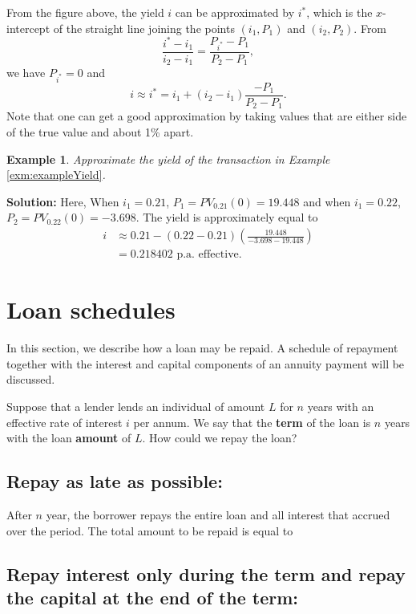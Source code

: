 \documentclass[
]{book}
\theoremstyle{definition}
\theoremstyle{definition}
\newtheorem{example}{Example}[chapter]
\theoremstyle{definition}
\theoremstyle{definition}
\theoremstyle{remark}
\begin{document}
From the figure above, the yield \(i\) can be approximated by \(i^*\), which
is the \(x\)-intercept of the straight line joining the points \((i_1,P_1)\)
and \((i_2,P_2)\). From
\[\frac{i^* -i_1}{i_2 - i_1} = \frac{P_{i^*} - P_1}{P_2 - P_1},\] we
have \(P_{i^*} = 0\) and
\[i \approx i^* =  i_1 + (i_2 - i_1) \frac{ - P_1}{P_2 - P_1}.\] Note
that one can get a good approximation by taking values that are either
side of the true value and about 1\% apart.

\begin{example}
\emph{Approximate the yield of the transaction in Example}
\ref{exm:exampleYield}\emph{.}
\end{example}

\textbf{Solution:} Here, When \(i_1 = 0.21\), \(P_1 = PV_{0.21}(0) = 19.448\) and
when \(i_1 = 0.22\), \(P_2 = PV_{0.22}(0) = -3.698.\) The yield is
approximately equal to \[\begin{aligned}
 i &\approx 0.21 - (0.22 - 0.21) \left(  \frac{19.448}{-3.698 - 19.448} \right) \\
   &= 0.218402 \text{ p.a. effective.}\end{aligned}\]

\section{Loan schedules}\label{loan-schedules}

In this section, we describe how a loan may be repaid. A schedule of
repayment together with the interest and capital components of an
annuity payment will be discussed.

Suppose that a lender lends an individual of amount \(L\) for \(n\) years
with an effective rate of interest \(i\) per annum. We say that the
\textbf{term} of the loan is \(n\) years with the loan \textbf{amount} of \(L\). How
could we repay the loan?

\subsection*{Repay as late as possible:}\label{repay-as-late-as-possible}

After \(n\) year, the borrower repays the entire loan and all interest
that accrued over the period. The total amount to be repaid is equal to

\subsection*{Repay interest only during the term and repay the capital at the end of the term:}\label{repay-interest-only-during-the-term-and-repay-the-capital-at-the-end-of-the-term}
\end{document}
